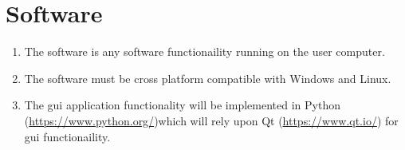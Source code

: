 \documentclass[12pt,a4paper]{article}
\begin{document}
\section{Software}
\begin{enumerate}[label*=\arabic*.]
\item The software is any software functionaility running on the user computer.
\item The software must be cross platform compatible with Windows and Linux.
\item The \gls{gui} application functionality will be implemented in Python (\url{https://www.python.org/})which will rely upon Qt (\url{https://www.qt.io/}) for \gls{gui} functionaility.
\end{enumerate}
\end{document}
